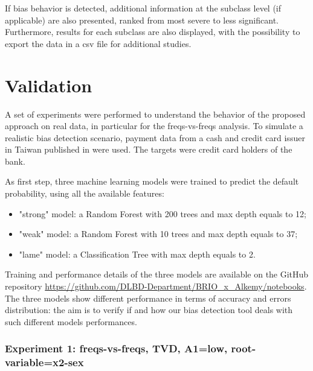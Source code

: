 \documentclass[
]{ceurart}
\begin{document}
If bias behavior is detected, additional information at the subclass level (if applicable) are also presented, ranked from most severe to less significant. Furthermore, results for each subclass are also displayed, with the possibility to export the data in a csv file for additional studies. 

\section{Validation}
\label{sec:validation}

A set of experiments were performed to understand the behavior of the proposed approach on real data, in particular for the freqs-vs-freqs analysis. To simulate a realistic bias detection scenario, payment data from a cash and credit card issuer in Taiwan published in \cite{YEH20092473} were used. The targets were credit card holders of the bank. 

As first step, three machine learning models were trained to predict the default probability, using all the available features:

\begin{itemize}
  \item "strong" model: a Random Forest with 200 trees and max depth equals to 12;
  \item "weak" model: a Random Forest with 10 trees and max depth equals to 37;
  \item "lame" model: a Classification Tree with max depth equals to 2.
\end{itemize}

Training and performance details of the three models are available on the GitHub repository \url{https://github.com/DLBD-Department/BRIO_x_Alkemy/notebooks}. The three models show different performance in terms of accuracy and errors distribution: the aim is to verify if and how our bias detection tool deals with such different models performances. 

\subsubsection{Experiment 1: freqs-vs-freqs, TVD, A1=low, root-variable=x2-sex}
\end{document}
